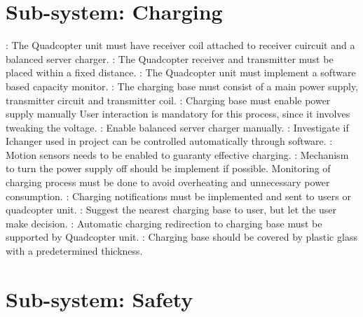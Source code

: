 \documentclass[a4paper]{article}
\begin{document}
\section{Sub-system: Charging}

: The Quadcopter unit must have receiver coil attached to receiver cuircuit and a balanced server charger.
: The Quadcopter receiver and transmitter must be placed within a fixed distance.
: The Quadcopter unit must implement a software based capacity monitor.
: The charging base must consist of a main power supply, transmitter circuit and transmitter coil.
: Charging base must enable power supply manually User interaction is mandatory for this process, since it involves tweaking the voltage.
: Enable balanced server charger manually.
: Investigate if Ichanger used in project can be controlled automatically  through software.
: Motion sensors needs to be enabled to guaranty effective charging.
: Mechanism to turn the power supply off should be implement if possible. Monitoring of charging process must be done to avoid overheating and unnecessary  power consumption.
: Charging notifications must be implemented and sent to users or quadcopter unit.
: Suggest the nearest charging base to user, but let the user make decision.
: Automatic charging redirection to charging base must be supported by Quadcopter unit.
: Charging base should be covered by plastic glass with a predetermined thickness.

\section{Sub-system: Safety}
\end{document}
